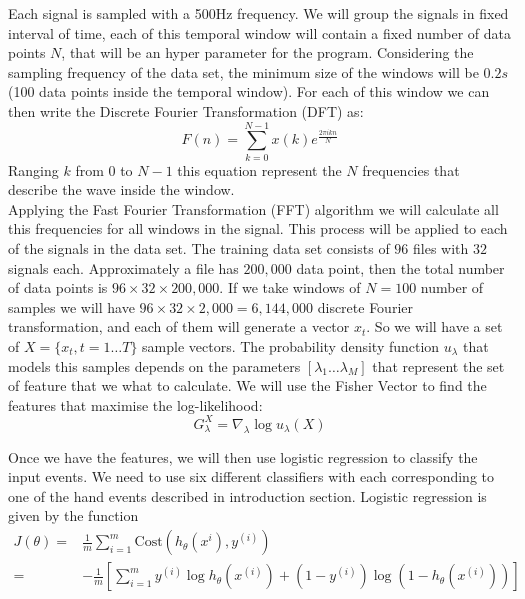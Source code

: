 \documentclass[final,leqno,onefignum,onetabnum]{siamltexmm}
\begin{document}
Each signal is sampled with a 500Hz frequency. We will group the signals in fixed interval of time, each of this temporal window will contain a fixed number of data points $N$, that will be an hyper parameter for the program. Considering the sampling frequency of the data set, the minimum size of the windows will be $0.2 s$ (100 data points inside the temporal window). 
For each of this window we can then write the Discrete Fourier Transformation (DFT) as:
\begin{equation}
  \label{DFT}
  F(n) =\sum_{k=0}^{N-1}x(k)e^{\frac{2\pi i kn}{N}}
\end{equation}  
Ranging $k$ from $0$ to $N-1$ this equation represent the $N$ frequencies that describe the wave inside the window.\\
Applying the Fast Fourier Transformation (FFT) algorithm\cite{FFT} we will calculate all this frequencies for all windows in the signal. This process will be applied to each of the signals in the data set. The training data set consists of $96$ files with $32$ signals each. Approximately a file has $200,000$ data point, then the total number of data points is $96\times 32 \times 200,000$. If we take windows of $N=100$ number of samples we will have $96\times 32 \times 2,000=6,144,000$ discrete Fourier transformation, and each of them will generate a vector $x_t$. So we will have a set of $X=\{x_t,t=1\dots T\}$ sample vectors. The probability density function  $u_\lambda$  that models this samples
depends on the parameters $[\lambda_1\dots \lambda_M]$ that represent the set of feature that we what to calculate. We will use the Fisher Vector\cite{fisher} to find the features that maximise the log-likelihood:
\begin{equation}\label{loglikelihood}
G_\lambda^X= \nabla_\lambda \log u_\lambda(X)
\end{equation}



Once we have the features, we will then use logistic regression to classify the input events.  We need to use six different classifiers with each corresponding to one of the hand events described in introduction section.  Logistic regression is given by the function
\begin{align*}
  J(\theta) = & \frac{1}{m} \sum_{i = 1}^{m} \mathrm{Cost}(h_{\theta}(x^{i}), y^{(i)}) \\
  = & -\frac{1}{m} [\sum_{i=1}^{m} y^{(i)} \log{h_{\theta}(x^{(i)} )} + (1 - y^{(i)}) \log{( 1 - h_{\theta}(x^{(i)}) )}]
\end{align*}
\end{document}
